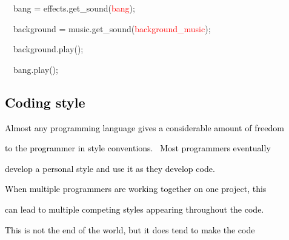 \documentclass[a4paper]{article}
\newcommand\textstyleOOoComputerKeyWord[1]{\textrm{\textcolor[rgb]{0.0,0.0,0.5019608}{#1}}}
\newcommand\textstyleOOoComputerIdent[1]{\textrm{\textcolor[rgb]{0.0,0.5019608,0.0}{#1}}}
\newcommand\textstyleOOoComputerLiteral[1]{\textrm{\textcolor{red}{#1}}}
\begin{document}
\bigskip

{\ttfamily\color{black}
\ \ \textstyleOOoComputerIdent{bang} \textstyleOOoComputerKeyWord{=}
\textstyleOOoComputerIdent{effects}\textstyleOOoComputerKeyWord{.}\textstyleOOoComputerIdent{get\_sound}\textstyleOOoComputerKeyWord{(}\textstyleOOoComputerLiteral{{\textquotedbl}bang{\textquotedbl}}\textstyleOOoComputerKeyWord{);}}

{\ttfamily\color{black}
\ \ \textstyleOOoComputerIdent{background} \textstyleOOoComputerKeyWord{=}
\textstyleOOoComputerIdent{music}\textstyleOOoComputerKeyWord{.}\textstyleOOoComputerIdent{get\_sound}\textstyleOOoComputerKeyWord{(}\textstyleOOoComputerLiteral{{\textquotedbl}background\_music{\textquotedbl}}\textstyleOOoComputerKeyWord{);}}


\bigskip

{\ttfamily\color{black}
\ \ \textstyleOOoComputerIdent{background}\textstyleOOoComputerKeyWord{.}\textstyleOOoComputerIdent{play}\textstyleOOoComputerKeyWord{();}}

{\ttfamily\color{black}
\ \ \textstyleOOoComputerIdent{bang}\textstyleOOoComputerKeyWord{.}\textstyleOOoComputerIdent{play}\textstyleOOoComputerKeyWord{();}}

\clearpage\subsection[Coding style]{\textstyleOOoComputerKeyWord{\textsf{\textcolor{black}{Coding style}}}}
\hypertarget{RefHeading4112869075401}{}{\color{black}
\textstyleOOoComputerKeyWord{\textcolor{black}{Almost any programming language gives a considerable amount of freedom}}}

{\color{black}
\textstyleOOoComputerKeyWord{\textcolor{black}{to the programmer in style conventions. \ Most programmers eventually}}}

{\color{black}
\textstyleOOoComputerKeyWord{\textcolor{black}{develop a personal style and use it as they develop code.}}}


\bigskip

{\color{black}
\textstyleOOoComputerKeyWord{\textcolor{black}{When multiple programmers are working together on one project, this}}}

{\color{black}
\textstyleOOoComputerKeyWord{\textcolor{black}{can lead to multiple competing styles appearing throughout the code.}}}

{\color{black}
\textstyleOOoComputerKeyWord{\textcolor{black}{This is not the end of the world, but it does tend to make the code}}}
\end{document}
